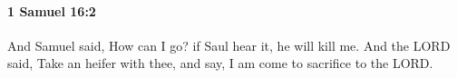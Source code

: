 
		\paragraph{1 Samuel 16:2} %
			\label{1SAMUEL-16-2}

			And Samuel said, How can I go? if Saul hear it, he will kill me. And the LORD said, Take an heifer with thee, and say, I am come to sacrifice to the LORD.


